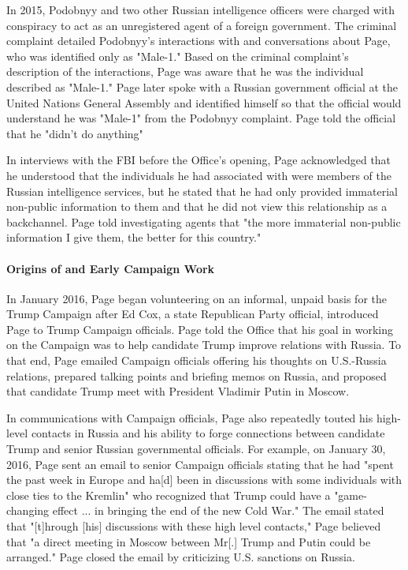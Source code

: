 In 2015, Podobnyy and two other Russian intelligence officers were charged with conspiracy to act as an unregistered agent of a foreign government.%
The criminal complaint detailed Podobnyy's interactions with and conversations about Page, who was identified only as "Male-1."%
Based on the criminal complaint's description of the interactions, Page was aware that he was the individual described as "Male-1."%
Page later spoke with a Russian government official at the United Nations General Assembly and identified himself so that the official would understand he was "Male-1" from the Podobnyy complaint. %
Page told the official that he "didn't do anything"

In interviews with the FBI before the Office's opening, Page acknowledged that he understood that the individuals he had associated with were members of the Russian intelligence services, but he stated that he had only provided immaterial non-public information to them and that he did not view this relationship as a backchannel.%
Page told investigating agents that "the more immaterial non-public information I give them, the better for this country."%

\paragraph{Origins of and Early Campaign Work}

In January 2016, Page began volunteering on an informal, unpaid basis for the Trump Campaign after Ed Cox, a state Republican Party official, introduced Page to Trump Campaign officials.%
Page told the Office that his goal in working on the Campaign was to help candidate Trump improve relations with Russia.%
To that end, Page emailed Campaign officials offering his thoughts on U.S.-Russia relations, prepared talking points and briefing memos on Russia, and proposed that candidate Trump meet with President Vladimir Putin in Moscow.%

In communications with Campaign officials, Page also repeatedly touted his high-level contacts in Russia and his ability to forge connections between candidate Trump and senior Russian governmental officials.
For example, on January 30, 2016, Page sent an email to senior Campaign officials stating that he had "spent the past week in Europe and ha[d] been in discussions with some individuals with close ties to the Kremlin" who recognized that Trump could have a "game-changing effect ... in bringing the end of the new Cold War."%
The email stated that "[t]hrough [his] discussions with these high level contacts," Page believed that "a direct meeting in Moscow between Mr[.] Trump and Putin could be arranged."%
Page closed the email by criticizing U.S. sanctions on Russia.%

